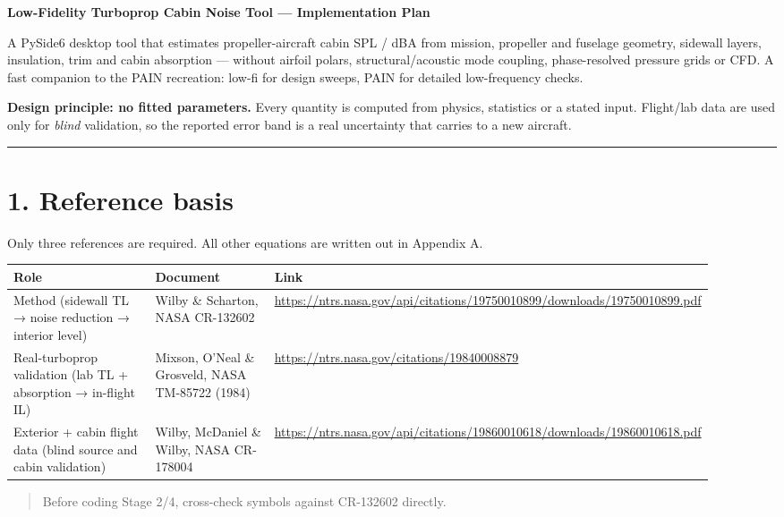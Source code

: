 \documentclass[10pt,a4paper]{article}
\begin{document}
{\LARGE\bfseries Low-Fidelity Turboprop Cabin Noise Tool — Implementation Plan\par}\bigskip

A PySide6 desktop tool that estimates propeller-aircraft cabin SPL / dBA from mission, propeller and fuselage geometry, sidewall layers, insulation, trim and cabin absorption — without airfoil polars, structural/acoustic mode coupling, phase-resolved pressure grids or CFD. A fast companion to the PAIN recreation: low-fi for design sweeps, PAIN for detailed low-frequency checks.

\textbf{Design principle: no fitted parameters.} Every quantity is computed from physics, statistics or a stated input. Flight/lab data are used only for \emph{blind} validation, so the reported error band is a real uncertainty that carries to a new aircraft.

\noindent\rule{\linewidth}{0.4pt}

\section*{1. Reference basis}

Only three references are required. All other equations are written out in Appendix A.

{\small
\begin{longtable}{>{\raggedright\arraybackslash}p{0.327\linewidth}>{\raggedright\arraybackslash}p{0.246\linewidth}>{\raggedright\arraybackslash}p{0.337\linewidth}}
\hline
\textbf{Role} & \textbf{Document} & \textbf{Link} \\
\hline
\endhead
Method (sidewall TL → noise reduction → interior level) & Wilby \& Scharton, NASA CR-132602 & \url{https://ntrs.nasa.gov/api/citations/19750010899/downloads/19750010899.pdf} \\
Real-turboprop validation (lab TL + absorption → in-flight IL) & Mixson, O'Neal \& Grosveld, NASA TM-85722 (1984) & \url{https://ntrs.nasa.gov/citations/19840008879} \\
Exterior + cabin flight data (blind source and cabin validation) & Wilby, McDaniel \& Wilby, NASA CR-178004 & \url{https://ntrs.nasa.gov/api/citations/19860010618/downloads/19860010618.pdf} \\
\hline
\end{longtable}}

\begin{quote}
Before coding Stage 2/4, cross-check symbols against CR-132602 directly.
\end{quote}
\end{document}
